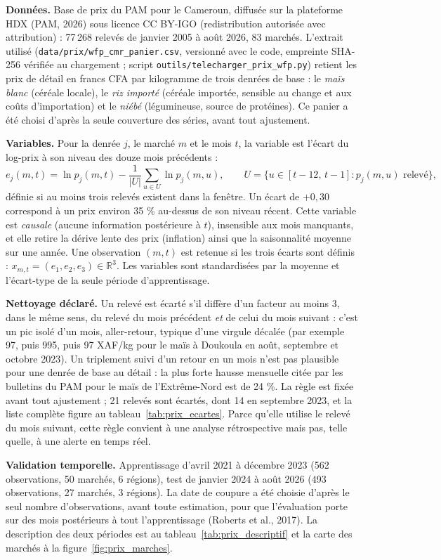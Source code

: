 \textbf{Données. }Base de prix du PAM pour le Cameroun, diffusée sur la plateforme HDX (PAM, 2026) sous licence CC BY-IGO (redistribution autorisée avec attribution) : 77\,268 relevés de janvier 2005 à août 2026, 83 marchés. L'extrait utilisé (\texttt{data/prix/wfp\_cmr\_panier.csv}, versionné avec le code, empreinte SHA-256 vérifiée au chargement ; script \texttt{outils/telecharger\_prix\_wfp.py}) retient les prix de détail en francs CFA par kilogramme de trois denrées de base : le \emph{maïs blanc} (céréale locale), le \emph{riz importé} (céréale importée, sensible au change et aux coûts d'importation) et le \emph{niébé} (légumineuse, source de protéines). Ce panier a été choisi d'après la seule couverture des séries, avant tout ajustement.

\textbf{Variables. }Pour la denrée $j$, le marché $m$ et le mois $t$, la variable est l'écart du log-prix à son niveau des douze mois précédents :
\[
e_j(m,t) = \ln p_j(m,t) - \frac{1}{|U|}\sum_{u \in U} \ln p_j(m,u), \qquad U = \{u \in [t-12,\, t-1] : p_j(m,u) \text{ relevé}\},
\]
définie si au moins trois relevés existent dans la fenêtre. Un écart de $+0{,}30$ correspond à un prix environ 35 \% au-dessus de son niveau récent. Cette variable est \emph{causale} (aucune information postérieure à $t$), insensible aux mois manquants, et elle retire la dérive lente des prix (inflation) ainsi que la saisonnalité moyenne sur une année. Une observation $(m,t)$ est retenue si les trois écarts sont définis : $x_{m,t} = (e_1, e_2, e_3) \in \mathbb{R}^3$. Les variables sont standardisées par la moyenne et l'écart-type de la seule période d'apprentissage.

\textbf{Nettoyage déclaré. }Un relevé est écarté s'il diffère d'un facteur au moins 3, dans le même sens, du relevé du mois précédent \emph{et} de celui du mois suivant : c'est un pic isolé d'un mois, aller-retour, typique d'une virgule décalée (par exemple 97, puis 995, puis 97 XAF/kg pour le maïs à Doukoula en août, septembre et octobre 2023). Un triplement suivi d'un retour en un mois n'est pas plausible pour une denrée de base au détail : la plus forte hausse mensuelle citée par les bulletins du PAM pour le maïs de l'Extrême-Nord est de 24 \%. La règle est fixée avant tout ajustement ; 21 relevés sont écartés, dont 14 en septembre 2023, et la liste complète figure au tableau~\ref{tab:prix_ecartes}. Parce qu'elle utilise le relevé du mois suivant, cette règle convient à une analyse rétrospective mais pas, telle quelle, à une alerte en temps réel.

\textbf{Validation temporelle. }Apprentissage d'avril 2021 à décembre 2023 (562 observations, 50 marchés, 6 régions), test de janvier 2024 à août 2026 (493 observations, 27 marchés, 3 régions). La date de coupure a été choisie d'après le seul nombre d'observations, avant toute estimation, pour que l'évaluation porte sur des mois postérieurs à tout l'apprentissage (Roberts et al., 2017). La description des deux périodes est au tableau~\ref{tab:prix_descriptif} et la carte des marchés à la figure~\ref{fig:prix_marches}.

